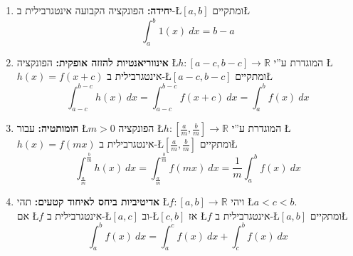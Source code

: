 \documentclass[english,hebrew]{article}
\theoremstyle{remark}
\theoremstyle{definition}
\theoremstyle{plain}
\theoremstyle{remark}
\theoremstyle{plain}
\theoremstyle{plain}
\begin{document}
\begin{enumerate}
\item \textbf{יחידה:} הפונקציה הקבועה {\endL} אינטגרבילית ב-\L{$\left[a,b\right]$}
ומתקיים\L{%
\[
\int_{a}^{b}1\left(x\right)\ dx=b-a
\]
}%
\item \textbf{אינווריאנטיות להזזה אופקית: }הפונקציה \L{$h:\left[a-c,b-c\right]\rightarrow\mathbb{R}$}
המוגדרת ע\textquotedblright י \L{$h(x)=f(x+c)$} אינטגרבילית ב-\L{$\left[a-c,b-c\right]$}
ומתקיים\L{%
\[
\int_{a-c}^{b-c}h(x)\ dx=\int_{a-c}^{b-c}f\left(x+c\right)\ dx=\int_{a}^{b}f(x)\ dx
\]
}%
\item \textbf{הומותטיה:} עבור \L{$m>0$} הפונקציה \L{$h:\left[\frac{a}{m},\frac{b}{m}\right]\rightarrow\mathbb{R}$}
המוגדרת ע\textquotedblright י \L{$h(x)=f(mx)$} אינטגרבילית ב-\L{$\left[\frac{a}{m},\frac{b}{m}\right]$}
ומתקיים\L{%
\[
\int_{\frac{a}{m}}^{\frac{b}{m}}h\left(x\right)\ dx=\int_{\frac{a}{m}}^{\frac{b}{m}}f\left(mx\right)\ dx=\frac{1}{m}\int_{a}^{b}f(x)\ dx
\]
}%
\item \textbf{אדיטיביות ביחס לאיחוד קטעים: }תהי \L{$f:\left[a,b\right]\rightarrow\mathbb{R}$}
ויהי \L{$a<c<b$}.\\
אם \L{$f$} אינטגרבילית ב-\L{$\left[a,c\right]$} וב-\L{$\left[c,b\right]$}
אז \L{$f$} אינטגרבילית ב-\L{$\left[a,b\right]$} ומתקיים\L{%
\[
\int_{a}^{b}f\left(x\right)\ dx=\int_{a}^{c}f\left(x\right)\ dx+\int_{c}^{b}f\left(x\right)\ dx
\]
}%
\end{enumerate}
\noindent{}
\end{document}
